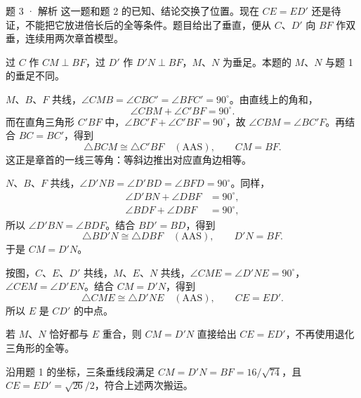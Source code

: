 \begin{solution}{题 3 · 解析}
\think 这一题和题 2 的已知、结论交换了位置。现在 \(CE=ED'\) 还是待证，不能把它放进倍长后的全等条件。题目给出了垂直，便从 \(C\)、\(D'\) 向 \(BF\) 作双垂，连续用两次章首模型。

\solve 过 \(C\) 作 \(CM\perp BF\)，过 \(D'\) 作 \(D'N\perp BF\)，\(M\)、\(N\) 为垂足。本题的 \(M\)、\(N\) 与题 1 的垂足不同。
\diagram{\diConverse}

\(M\)、\(B\)、\(F\) 共线，\(\angle CMB=\angle CBC'=\angle BFC'=90^\circ\)。由直线上的角和，
\[
\angle CBM+\angle C'BF=90^\circ.
\]
而在直角三角形 \(C'BF\) 中，\(\angle BC'F+\angle C'BF=90^\circ\)，故 \(\angle CBM=\angle BC'F\)。再结合 \(BC=BC'\)，得到
\[
\triangle BCM\cong\triangle C'BF\quad(\mathrm{AAS}),\qquad CM=BF.
\]
这正是章首的一线三等角：等斜边推出对应直角边相等。

\(N\)、\(B\)、\(F\) 共线，\(\angle D'NB=\angle D'BD=\angle BFD=90^\circ\)。同样，
\begin{align*}
\angle D'BN+\angle DBF&=90^\circ,\\
\angle BDF+\angle DBF&=90^\circ,
\end{align*}
所以 \(\angle D'BN=\angle BDF\)。结合 \(BD'=BD\)，得到
\[
\triangle BD'N\cong\triangle DBF\quad(\mathrm{AAS}),\qquad D'N=BF.
\]
于是 \(CM=D'N\)。

按图，\(C\)、\(E\)、\(D'\) 共线，\(M\)、\(E\)、\(N\) 共线，\(\angle CME=\angle D'NE=90^\circ\)，\(\angle CEM=\angle D'EN\)。结合 \(CM=D'N\)，得到
\[
\triangle CME\cong\triangle D'NE\quad(\mathrm{AAS}),\qquad CE=ED'.
\]
所以 \(E\) 是 \(CD'\) 的中点。

若 \(M\)、\(N\) 恰好都与 \(E\) 重合，则 \(CM=D'N\) 直接给出 \(CE=ED'\)，不再使用退化三角形的全等。

\checkup 沿用题 1 的坐标，三条垂线段满足 \(CM=D'N=BF=16/\sqrt{74}\)，且 \(CE=ED'=\sqrt{26}/2\)，符合上述两次搬运。
\end{solution}
\clearpage
